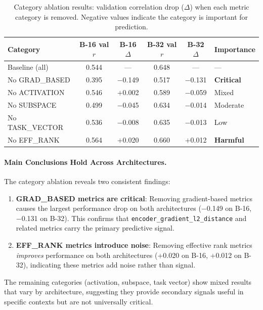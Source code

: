 \begin{table}[h]
\centering
\caption{Category ablation results: validation correlation drop ($\Delta$) when each metric category is removed. Negative values indicate the category is important for prediction.}
\label{tab:category_ablation}
\begin{tabular}{l|cc|cc|l}
\toprule
\textbf{Category} & \textbf{B-16 val $r$} & \textbf{B-16 $\Delta$} & \textbf{B-32 val $r$} & \textbf{B-32 $\Delta$} & \textbf{Importance} \\
\midrule
Baseline (all) & 0.544 & --- & 0.648 & --- & --- \\
\midrule
No GRAD\_BASED & 0.395 & $-$0.149 & 0.517 & $-$0.131 & \textbf{Critical} \\
No ACTIVATION & 0.546 & $+$0.002 & 0.589 & $-$0.059 & Mixed \\
No SUBSPACE & 0.499 & $-$0.045 & 0.634 & $-$0.014 & Moderate \\
No TASK\_VECTOR & 0.536 & $-$0.008 & 0.635 & $-$0.013 & Low \\
No EFF\_RANK & 0.564 & $+$0.020 & 0.660 & $+$0.012 & \textbf{Harmful} \\
\bottomrule
\end{tabular}
\end{table}

\paragraph{Main Conclusions Hold Across Architectures.}
The category ablation reveals two consistent findings:
\begin{enumerate}
    \item \textbf{GRAD\_BASED metrics are critical}: Removing gradient-based metrics causes the largest performance drop on both architectures ($-$0.149 on B-16, $-$0.131 on B-32). This confirms that \texttt{encoder\_gradient\_l2\_distance} and related metrics carry the primary predictive signal.
    \item \textbf{EFF\_RANK metrics introduce noise}: Removing effective rank metrics \emph{improves} performance on both architectures ($+$0.020 on B-16, $+$0.012 on B-32), indicating these metrics add noise rather than signal.
\end{enumerate}

The remaining categories (activation, subspace, task vector) show mixed results that vary by architecture, suggesting they provide secondary signals useful in specific contexts but are not universally critical.

